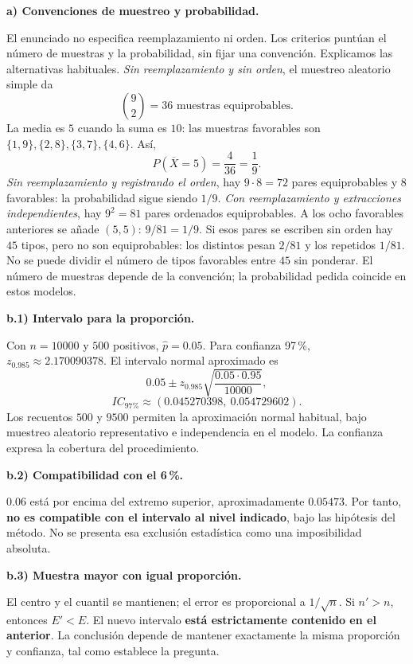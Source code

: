 \textbf{a) Convenciones de muestreo y probabilidad.}\par\nopagebreak[4]
El enunciado no especifica reemplazamiento ni orden. Los criterios puntúan el número de muestras y la probabilidad, sin fijar una convención. Explicamos las alternativas habituales.
\emph{Sin reemplazamiento y sin orden}, el muestreo aleatorio simple da
\[
\boxed{\binom92=36\text{ muestras equiprobables}.}
\]
La media es $5$ cuando la suma es $10$: las muestras favorables son $\{1,9\},\{2,8\},\{3,7\},\{4,6\}$. Así,
\[
\boxed{P(\overline X=5)=\frac4{36}=\frac19.}
\]
\emph{Sin reemplazamiento y registrando el orden}, hay $9\cdot8=72$ pares equiprobables y $8$ favorables: la probabilidad sigue siendo $1/9$.
\emph{Con reemplazamiento y extracciones independientes}, hay $9^2=81$ pares ordenados equiprobables. A los ocho favorables anteriores se añade $(5,5)$: $9/81=1/9$. Si esos pares se escriben sin orden hay $45$ tipos, pero no son equiprobables: los distintos pesan $2/81$ y los repetidos $1/81$. No se puede dividir el número de tipos favorables entre $45$ sin ponderar. El número de muestras depende de la convención; la probabilidad pedida coincide en estos modelos.

\textbf{b.1) Intervalo para la proporción.}\par\nopagebreak[4]
Con $n=10000$ y $500$ positivos, $\widehat p=0.05$. Para confianza 97\,\%, $z_{0.985}\approx2.170090378$. El intervalo normal aproximado es
\[
0.05\pm z_{0.985}\sqrt{\frac{0.05\cdot0.95}{10000}},
\]
\[
\boxed{IC_{\text{97\%}}\approx(0.045270398,\ 0.054729602).}
\]
Los recuentos $500$ y $9500$ permiten la aproximación normal habitual, bajo muestreo aleatorio representativo e independencia en el modelo. La confianza expresa la cobertura del procedimiento.

\textbf{b.2) Compatibilidad con el 6\,\%.}\par\nopagebreak[4]
$0.06$ está por encima del extremo superior, aproximadamente $0.05473$. Por tanto, \textbf{no es compatible con el intervalo al nivel indicado}, bajo las hipótesis del método. No se presenta esa exclusión estadística como una imposibilidad absoluta.

\textbf{b.3) Muestra mayor con igual proporción.}\par\nopagebreak[4]
El centro y el cuantil se mantienen; el error es proporcional a $1/\sqrt n$. Si $n'>n$, entonces $E'<E$. El nuevo intervalo \textbf{está estrictamente contenido en el anterior}. La conclusión depende de mantener exactamente la misma proporción y confianza, tal como establece la pregunta.
